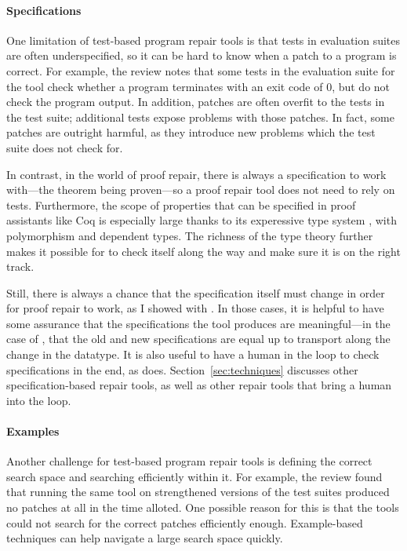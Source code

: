 \paragraph{Specifications}
One limitation of test-based program repair tools is that tests in evaluation suites are often underspecified,
so it can be hard to know when a patch to a program is correct.
For example, the review notes that some tests in the evaluation suite for the tool check whether a program terminates with an exit code of 0, 
but do not check the program output.
In addition, patches are often overfit to the tests in the test suite; additional tests expose problems with those patches.
In fact, some patches are outright harmful, as they introduce new problems which the test suite does not check for.

In contrast, in the world of proof repair, there is always a specification to work with---the theorem being proven---so
a proof repair tool does not need to rely on tests.
Furthermore, the scope of properties that can be specified in proof assistants like Coq is especially large thanks to its experessive type system ,
with polymorphism and dependent types.
The richness of the type theory further makes it possible for \sysnamelong to check itself along the way and make sure it is on the right track.

Still, there is always a chance that the specification itself must change in order for proof repair to work,
as I showed with \toolnamec.
In those cases, it is helpful to have some assurance that the specifications the tool produces are meaningful---in the case of
\toolnamec, that the old and new specifications are equal up to transport along the change in the datatype.
It is also useful to have a human in the loop to check specifications in the end,
as \toolnamec does.
Section~\ref{sec:techniques} discusses other specification-based repair tools,
as well as other repair tools that bring a human into the loop.

\paragraph{Examples}
Another challenge for test-based program repair tools is defining the correct search space and searching efficiently within it.
For example, the review found that running the same tool on strengthened versions of the test suites produced no patches at all in the time alloted.
One possible reason for this is that the tools could not search for the correct patches efficiently enough.
Example-based techniques can help navigate a large search space quickly.

